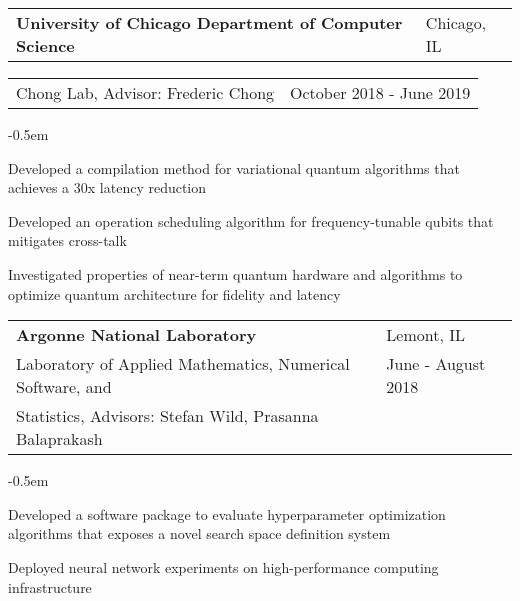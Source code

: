 \documentclass[letterpaper, 12pt]{article}
\let\olditemize=\itemize
\let\endolditemize=\enditemize
\renewenvironment{itemize}{\olditemize \itemsep-0.5em}
                 {\endolditemize}
\begin{document}
\begin{tabular}{@{} L{12cm} @{} R{4.51cm} @{}}
  \textbf{University of Chicago Department of Computer Science} & Chicago, IL \\
\end{tabular}
\begin{tabular}{@{} L{11cm} @{} R{5.51cm} @{}}
  Chong Lab, Advisor: Frederic Chong & October 2018 - June 2019 \\
\end{tabular}
\vspace{-2.0em}
\begin{itemize}
  \item Developed a compilation method for variational quantum algorithms that achieves a 30x latency reduction
  \item Developed an operation scheduling algorithm for frequency-tunable qubits that mitigates cross-talk
  \item Investigated properties of near-term quantum hardware and algorithms to optimize quantum architecture for fidelity and latency
\end{itemize}
\vspace{-0.5em}

\begin{tabular}{@{} L{12cm} @{} R{4.51cm} @{}}
  \textbf{Argonne National Laboratory} & Lemont, IL \\
  Laboratory of Applied Mathematics, Numerical Software, and & June - August 2018 \\
  Statistics, Advisors: Stefan Wild, Prasanna Balaprakash & \\
\end{tabular}
\vspace{-1.4em}
\begin{itemize}
  \item Developed a software package to evaluate hyperparameter optimization algorithms that exposes a novel search space definition system
  \item Deployed neural network experiments on high-performance computing infrastructure 
\end{itemize}
\vspace{-0.5em}
\end{document}
